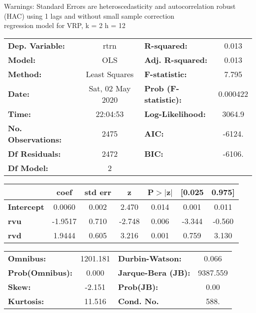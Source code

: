 Warnings: \newline
 [1] Standard Errors are heteroscedasticity and autocorrelation robust (HAC) using 1 lags and without small sample correction\\ 

regression model for VRP, k = 2 h = 12\begin{center}
\begin{tabular}{lclc}
\toprule
\textbf{Dep. Variable:}    &       rtrn       & \textbf{  R-squared:         } &     0.013   \\
\textbf{Model:}            &       OLS        & \textbf{  Adj. R-squared:    } &     0.013   \\
\textbf{Method:}           &  Least Squares   & \textbf{  F-statistic:       } &     7.795   \\
\textbf{Date:}             & Sat, 02 May 2020 & \textbf{  Prob (F-statistic):} &  0.000422   \\
\textbf{Time:}             &     22:04:53     & \textbf{  Log-Likelihood:    } &    3064.9   \\
\textbf{No. Observations:} &        2475      & \textbf{  AIC:               } &    -6124.   \\
\textbf{Df Residuals:}     &        2472      & \textbf{  BIC:               } &    -6106.   \\
\textbf{Df Model:}         &           2      & \textbf{                     } &             \\
\bottomrule
\end{tabular}
\begin{tabular}{lcccccc}
                   & \textbf{coef} & \textbf{std err} & \textbf{z} & \textbf{P$> |$z$|$} & \textbf{[0.025} & \textbf{0.975]}  \\
\midrule
\textbf{Intercept} &       0.0060  &        0.002     &     2.470  &         0.014        &        0.001    &        0.011     \\
\textbf{rvu}       &      -1.9517  &        0.710     &    -2.748  &         0.006        &       -3.344    &       -0.560     \\
\textbf{rvd}       &       1.9444  &        0.605     &     3.216  &         0.001        &        0.759    &        3.130     \\
\bottomrule
\end{tabular}
\begin{tabular}{lclc}
\textbf{Omnibus:}       & 1201.181 & \textbf{  Durbin-Watson:     } &    0.066  \\
\textbf{Prob(Omnibus):} &   0.000  & \textbf{  Jarque-Bera (JB):  } & 9387.559  \\
\textbf{Skew:}          &  -2.151  & \textbf{  Prob(JB):          } &     0.00  \\
\textbf{Kurtosis:}      &  11.516  & \textbf{  Cond. No.          } &     588.  \\
\bottomrule
\end{tabular}
\end{center}

